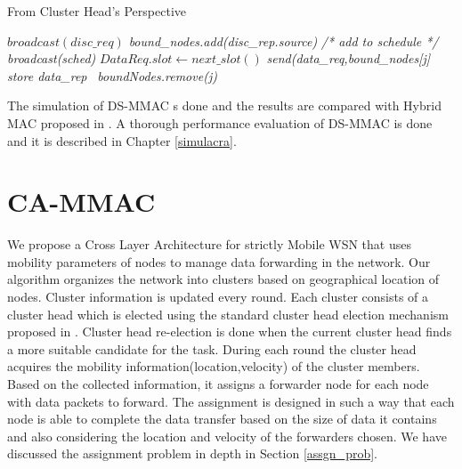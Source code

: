 \begin{algorithm}[H]
	\caption{From Cluster Head's Perspective}
	\label{algo:ch}
\begin{algorithmic}[1]
	\State $broadcast(disc\_req)$
		\State \emph{bound\_nodes.add(disc\_rep.source)}
	\EndWhile
		\State \emph{/* add to schedule */}
	\EndFor
	\State \emph{broadcast(sched)}
		\State $DataReq.slot \gets next\_slot()$
		\State \emph{send(data\_req,bound\_nodes[j]}
			\State \emph{store data\_rep}
		\Else\ \emph{boundNodes.remove(j)}
		\EndIf
	\EndFor
\EndIf
\EndWhile
\EndProcedure
\end{algorithmic}
\end{algorithm}
%

The simulation of DS-MMAC s done and the results are compared with Hybrid MAC proposed in \cite{hmac}. A thorough performance evaluation of DS-MMAC is done and it is described in Chapter \ref{simulacra}.


\section{CA-MMAC}
We propose a Cross Layer Architecture for strictly Mobile WSN that uses mobility parameters of nodes to manage data forwarding in the network. Our algorithm organizes the network into clusters based on geographical location of nodes. Cluster information is updated every round. Each cluster consists of a cluster head which is elected using the standard cluster head election mechanism proposed in \cite{leach}. Cluster head re-election is done when the current cluster head finds a more suitable candidate for the task. During each round the cluster head acquires the mobility information(location,velocity) of the cluster members. Based on the collected information, it assigns a forwarder node for each node with data packets to forward. The assignment is designed in such a way that each node is able to complete the data transfer based on the size of data it contains and also considering the location and velocity of the forwarders chosen. We have discussed the assignment problem in depth in Section \ref{assgn_prob}.


